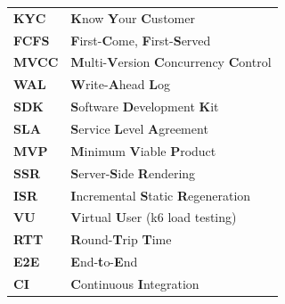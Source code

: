 \begin{center}
\begin{tabular}{ll}
\textbf{KYC} & \textbf{K}now \textbf{Y}our \textbf{C}ustomer \\
\textbf{FCFS} & \textbf{F}irst-\textbf{C}ome, \textbf{F}irst-\textbf{S}erved \\
\textbf{MVCC} & \textbf{M}ulti-\textbf{V}ersion \textbf{C}oncurrency \textbf{C}ontrol \\
\textbf{WAL} & \textbf{W}rite-\textbf{A}head \textbf{L}og \\
\textbf{SDK} & \textbf{S}oftware \textbf{D}evelopment \textbf{K}it \\
\textbf{SLA} & \textbf{S}ervice \textbf{L}evel \textbf{A}greement \\
\textbf{MVP} & \textbf{M}inimum \textbf{V}iable \textbf{P}roduct \\
\textbf{SSR} & \textbf{S}erver-\textbf{S}ide \textbf{R}endering \\
\textbf{ISR} & \textbf{I}ncremental \textbf{S}tatic \textbf{R}egeneration \\
\textbf{VU} & \textbf{V}irtual \textbf{U}ser (k6 load testing) \\
\textbf{RTT} & \textbf{R}ound-\textbf{T}rip \textbf{T}ime \\
\textbf{E2E} & \textbf{E}nd-\textbf{t}o-\textbf{E}nd \\
\textbf{CI} & \textbf{C}ontinuous \textbf{I}ntegration \\
\end{tabular}
\end{center}

\vfill
\clearpage